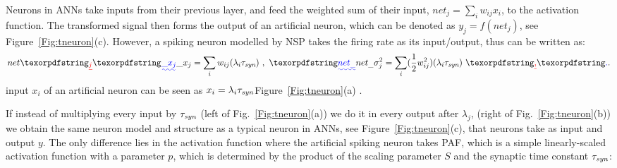 	Neurons in ANNs take inputs from their previous layer, and feed the weighted sum of their input, $net_j = \sum_i w_{ij}x_i$, to the activation function.
	The transformed signal then forms the output of an artificial neuron, which can be denoted as $y_j=f(net_j)$, see Figure~\ref{Fig:tneuron}(c).
	However, a spiking neuron modelled by NSP takes the firing rate as its input/output, thus \DIFdelbegin {}\DIFdelend \DIFaddbegin {}\DIFaddend can be written as:
	\begin{equation}
	net\DIFdelbegin \DIFdel{_j }\DIFdelend \DIFaddbegin \DIFadd{\_x_{j} }\DIFaddend = \sum_i w_{ij}(\lambda_{i}\tau_{\textit{\textrm{syn}}})~,
	~\DIFaddbegin \DIFadd{net_\_}\DIFaddend \sigma^2_j= \sum_i (\frac{1}{2} w_{ij}^2)(\lambda_{i}\tau_{\textit{\textrm{syn}}})~\DIFdelbegin \DIFdel{, 
	}\DIFdelend \DIFaddbegin \DIFadd{.
	}\DIFaddend %
	\label{equ:mi_input}
	\end{equation}
	\DIFdelbegin {}\DIFdelend \DIFaddbegin {}\DIFaddend input $ x_i $ of an artificial \DIFaddbegin {}\DIFaddend neuron can be seen as $x_i=\lambda_{i}\tau_{\textit{\textrm{syn}}}$\DIFdelbegin {}\DIFdelend \DIFaddbegin {}\DIFaddend Figure~\ref{Fig:tneuron}(a) \DIFaddbegin {}\DIFaddend . 

	
	If instead of multiplying every input by $\tau_{\textit{\textrm{syn}}}$ (left of Fig.~\ref{Fig:tneuron}(a)) we do it in every output after $\lambda_j$, (right of Fig.~\ref{Fig:tneuron}(b)) we obtain the same neuron model and structure as a typical neuron in ANNs, see Figure~\ref{Fig:tneuron}(c), that neurons take \DIFdelbegin {}\DIFdelend \DIFaddbegin {}\DIFaddend as input and output \DIFaddbegin {}\DIFaddend $y$.
	The only difference lies in the activation function where the artificial spiking neuron takes PAF, which is a simple linearly-scaled activation function with a parameter $p$, which is determined by the product of the scaling parameter $S$ and the synaptic time constant $\tau_{\textit{\textrm{syn}}}$:
	\DIFdelbegin %

